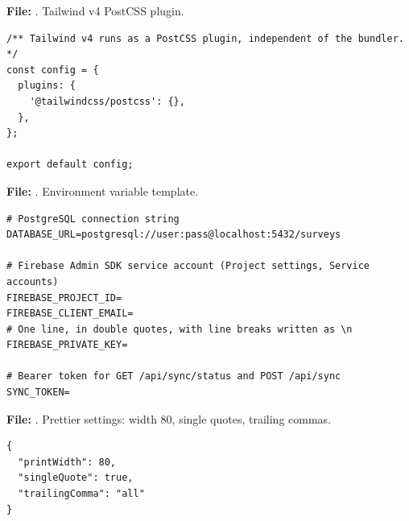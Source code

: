 \documentclass[11pt,a4paper]{article}
\begin{document}
\textbf{File:} . Tailwind v4 PostCSS plugin.\par
\begin{lstlisting}
/** Tailwind v4 runs as a PostCSS plugin, independent of the bundler. */
const config = {
  plugins: {
    '@tailwindcss/postcss': {},
  },
};

export default config;
\end{lstlisting}

\textbf{File:} . Environment variable template.\par
\begin{lstlisting}
# PostgreSQL connection string
DATABASE_URL=postgresql://user:pass@localhost:5432/surveys

# Firebase Admin SDK service account (Project settings, Service accounts)
FIREBASE_PROJECT_ID=
FIREBASE_CLIENT_EMAIL=
# One line, in double quotes, with line breaks written as \n
FIREBASE_PRIVATE_KEY=

# Bearer token for GET /api/sync/status and POST /api/sync
SYNC_TOKEN=
\end{lstlisting}

\textbf{File:} . Prettier settings: width 80, single quotes, trailing commas.\par
\begin{lstlisting}
{
  "printWidth": 80,
  "singleQuote": true,
  "trailingComma": "all"
}
\end{lstlisting}
\end{document}
